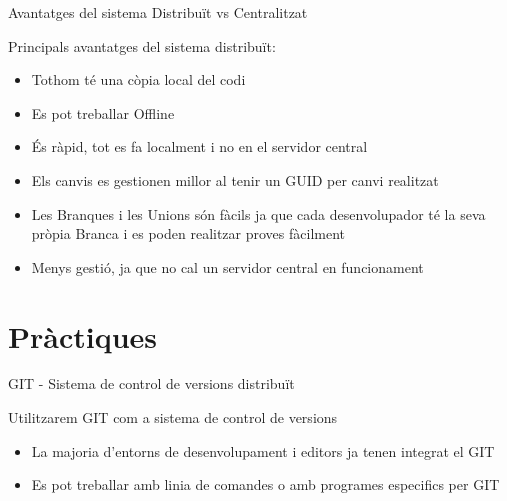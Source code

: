 \documentclass[10pt,xcolor={rgb}]{beamer}
\begin{document}
    \begin{frame}[fragile]{Avantatges del sistema Distribuït vs Centralitzat}
      
            \begin{block}{Principals avantatges del sistema distribuït:}
      
              \begin{itemize}
                \item Tothom té una còpia local del codi
                \item Es pot treballar Offline
                \item És ràpid, tot es fa localment i no en el servidor central
                \item Els canvis es gestionen millor al tenir un GUID per canvi realitzat
                \item Les Branques i les Unions són fàcils ja que cada desenvolupador té la seva pròpia Branca i es poden realitzar proves fàcilment
                \item Menys gestió, ja que no cal un servidor central en funcionament
              \end{itemize}
      
            \end{block}
      
    \end{frame}

    \section{Pràctiques}
    
    \begin{frame}[fragile]{GIT - Sistema de control de versions distribuït}
            \begin{block}{Utilitzarem GIT com a sistema de control de versions}
      
              \begin{itemize}
                \item La majoria d'entorns de desenvolupament i editors ja tenen integrat el GIT
                \item Es pot treballar amb linia de comandes o amb programes especifics per GIT
              \end{itemize}
      
            \end{block}
    \end{frame}
\end{document}
